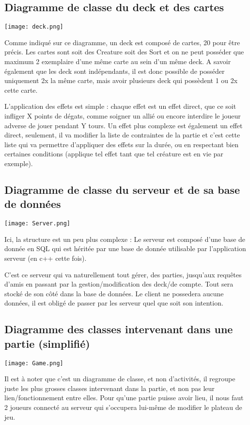 \documentclass{article}
\begin{document}
		\newpage
		\subsection{Diagramme de classe du \gls{deck} et des cartes}
		\begin{center}\texttt{[image: deck.png]}\end{center}
			Comme indiqué sur ce diagramme, un \gls{deck} est composé de cartes, 20 pour être précis. Les cartes sont soit des \gls{Creature}
			soit des \gls{Sort} et on ne peut posséder que maximum 2 exemplaire d'une même carte au sein d'un même \gls{deck}.
			A savoir également que les \gls{deck} sont indépendants, il est donc possible de posséder uniquement 2x la même carte,
			mais avoir plusieurs \gls{deck} qui possèdent 1 ou 2x cette carte.

			L'application des effets est simple : chaque effet est un effet direct, que ce soit infliger X points de dégats, comme soigner un allié ou encore interdire le joueur adverse de jouer pendant Y tours.
			Un effet plus complexe est également un effet direct, seulement, il va modifier la liste de contraintes de la partie et c'est cette liste qui va permettre d'appliquer des effets sur la durée, ou en respectant bien certaines conditions (applique tel effet tant que tel créature est en vie par exemple).

		\newpage
		\subsection{Diagramme de classe du serveur et de sa base de données}
		\begin{center}\texttt{[image: Server.png]}\end{center}
			Ici, la structure est un peu plus complexe : Le serveur est composé d'une base de donnée en SQL qui est héritée par 
			une base de donnée utilisable par l'application serveur (en c++ cette fois).

			C'est ce serveur qui va naturellement tout gérer, des parties, jusqu'aux requêtes d'amis en passant
			par la gestion/modification des \gls{deck}/de compte. Tout sera stocké de son côté dans la base de données.
			Le client ne possedera aucune données, il est obligé de passer par les serveur quel que soit son intention.

		\newpage
		\subsection{Diagramme des classes intervenant dans une partie (simplifié)}
		\begin{center}\texttt{[image: Game.png]}\end{center}
			Il est à noter que c'est un diagramme de classe, et non d'activités, il regroupe juste les plus grosses classes intervenant dans la partie,
			et non pas leur lien/fonctionnement entre elles.
			Pour qu'une partie puisse avoir lieu, il nous faut 2 joueurs connecté au serveur qui s'occupera lui-même de modifier le plateau de jeu.
\end{document}
